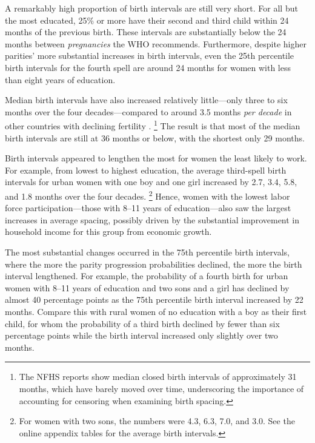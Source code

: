 \documentclass[12pt,letterpaper]{article}
\begin{document}
A remarkably high proportion of birth intervals are still very short.
For all but the most educated, 25\% or more have their second and third child 
within 24 months of the previous birth.
These intervals are substantially below the 24 months between 
\emph{pregnancies} the WHO recommends.
Furthermore, despite higher parities' more substantial increases in birth intervals, even 
the 25th percentile birth intervals for the fourth spell are around 24 months for women 
with less than eight years of education.

Median birth intervals have also increased relatively little---only three to six months 
over the four decades---compared to around 3.5 months \emph{per decade} in other countries with 
declining fertility \citep{Rutstein2011,Casterline2016}.%
\footnote{
The NFHS reports show median closed birth intervals of approximately 31 months, which have 
barely moved over time, underscoring the importance of accounting for censoring when examining 
birth spacing.
}
The result is that most of the median birth intervals are still at 36 months or below, 
with the shortest only 29 months.


Birth intervals appeared to lengthen the most for women the least likely to work.
For example, from lowest to highest education, the average third-spell birth intervals for 
urban women with one boy and one girl increased by 2.7, 3.4, 5.8, and 1.8 months over the 
four decades.%
\footnote{
For women with two sons, the numbers were 4.3, 6.3, 7.0, and 3.0.
See the online appendix tables for the average birth intervals.
}
Hence, women with the lowest labor force participation---those with 8--11 years 
of education---also saw the largest increases in average spacing, possibly driven by the 
substantial improvement in household income for this group from economic growth.


The most substantial changes occurred in the 75th percentile birth intervals, where the 
more the parity progression probabilities declined, the more the birth interval lengthened. 
For example, the probability of a fourth birth for urban women with 8--11 years 
of education and two sons and a girl has declined by almost 40 percentage points as the 
75th percentile birth interval increased by 22 months.
Compare this with rural women of no education with a boy as their first child, for whom the 
probability of a third birth declined by fewer than six percentage points while the birth 
interval increased only slightly over two months.
\end{document}
